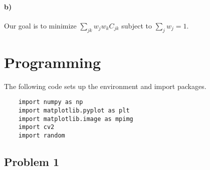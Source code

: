 \documentclass{article}
\begin{document}
\paragraph{b)}
Our goal is to minimize $\sum_{jk} w_j w_k C_{jk}$ subject to $\sum_{j} w_j = 1$.

\newpage
\section{Programming}
The following code sets up the environment and import packages.
\begin{lstlisting}
	import numpy as np
	import matplotlib.pyplot as plt
	import matplotlib.image as mpimg
	import cv2
	import random
\end{lstlisting}

\subsection*{Problem 1}
%
%
\end{document}
